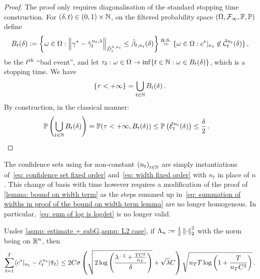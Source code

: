 \begin{proof}
    The proof only requires diagonalisation of the standard stopping time construction. For $(\delta,t)\in(0,1)\times\mathbb{N}$, on the filtered probability space $(\Omega,\mathcal{F}_\infty,\mathbb{F},\mathbb{P})$ define 
    \[ 
        B_t(\delta):=\left\{\omega\in\Omega: \left\lVert\gamma^* -\hat \gamma^{n_t,\lambda}_t\right\rVert_{\tilde{D}_t^{\lambda,n_t}}\le \tilde{\beta}_{t,n_t}(\delta) \right\}\overset{\mbox{a.s.}}{=}\{\omega\in\Omega: c^*\vert_{n_t} \not\in \tilde{\mathcal{C}}_{t}^{n_t}(\delta)\}\,,
    \]
    be the $t\textsuperscript{th}$ ``bad event'', and let $\tau_\delta: \omega\in\Omega\to\inf\{t\in\mathbb{N}: \omega\in B_t(\delta)\}$, which is a stopping time. We have 
    \[
        \{\tau <+\infty\}= \bigcup_{t\in\mathbb{N}} B_t(\delta)\,.
    \]
    By construction, in the classical manner:
    \begin{align*}
        \mathbb{P}\left(\bigcup_{t\in\mathbb{N}} B_t(\delta)\right)&= \mathbb{P}(\tau<+\infty, B_t(\delta))\le \mathbb{P}\left(\tilde{\mathcal{E}}_t^{n_t}(\delta)\right)\le \frac{\delta}2\,.
    \end{align*}
\end{proof}

The confidence sets using for non-constant ${(n_t)}_{t\in\mathbb{N}}$ are simply instantiations of~\eqref{eq: confidence set fixed order} and~\eqref{eq: width fixed order} with $n_t$ in place of $n$. This change of basis with time however requires a modification of the proof of \cref{lemma: bound on width term} as the steps summed up in~\eqref{eq: summation of widths in proof of the bound on width term lemma} are no longer homogenous. In particular,~\eqref{eq: sum of log is logdet} is no longer valid. 

\begin{lemma}\label{lemma: bound on width term with varying basis order}
    Under \cref{asmp: estimate + subG,asmp: L2 case}, if $\Lambda_n:=\frac{1}{2}\left\lVert\cdot\right\rVert_{2}^2$ with the norm being on $\mathbb{R}^n$, then
    \begin{align}
        \sum_{t=1}^T\langle c^*\vert_{n_t} -\tilde c_t^{\,n_t}\vert \tilde\pi_t\rangle\le 2C\sigma\left( \sqrt{2\log\left(\frac{\lambda^{-1}+\frac{TC^2}{n_T}}{\delta}\right)}+\sqrt{\lambda}C\right) \sqrt{n_T T\log\left(1+ \frac{T}{n_TC^2}\right)}\,.\notag
    \end{align}
\end{lemma}

